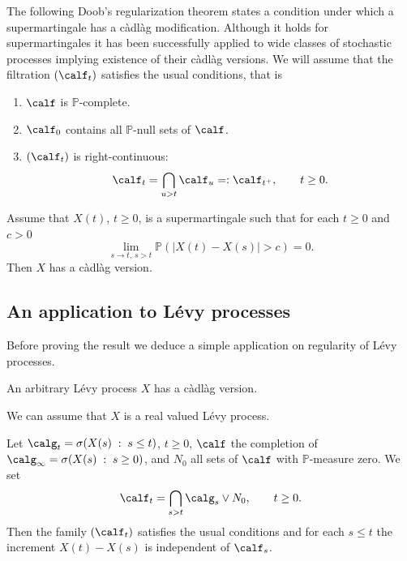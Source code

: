 \documentclass[preprint]{imsart}
\def\P{\mathbb P}
\begin{document}
{The following Doob's regularization theorem states a condition
under which a supermartingale has a c\`adl\`ag modification.
Although it holds for supermartingales it has been successfully
applied to wide classes of stochastic processes implying existence
of their c\`adl\`ag versions.
We will assume that the filtration $(\calf_t)$ satisfies the
usual conditions, that is
\begin{enumerate}
\item[1)] $\calf$ is $\P$-complete.
\item[2)] $\calf_0 $ contains all $\P$-null sets of $\calf$.
\item[3)] $(\calf_t)$ is right-continuous:
$$
\calf_t= \bigcap_{u>t}\calf_u=: \calf_{t^+},
\qquad t\ge 0.
$$
\end{enumerate}

\begin{Theorem}\label{doobreg}
  Assume that $X(t)$, $t\ge0$, is a supermartingale such that for
  each $t\ge 0$ and $c>0$
\begin{equation}\label{stocconti}
  \lim_{s\to t,\, s>t}\P (|X(t)-X(s)|>c)=0.
\end{equation}
Then $X$ has a c\`adl\`ag version.
\end{Theorem}

\subsection{An application to L\'evy processes}

Before proving the result we deduce a simple application on
regularity of L\'evy processes.

\begin{Theorem}\label{reglevyproc}
An arbitrary  L\'evy process  $X$
 has a c\`adl\`ag version.
\end{Theorem}

We can assume that $X$ is a real valued  L\'evy process.

Let $\calg_t=\sigma (X(s)\; :\; s\le t)$, $t\ge 0$,
$\calf$ the completion of $\calg_\infty = \sigma (X(s)\; :\; s\ge
0)$, and $N_0$ all sets of $\calf$ with $\P$-measure zero.
We set
$$
\calf_t = \bigcap_{s>t}\calg_s\vee N_0, \qquad t\ge0.
$$
Then the family $(\calf_t)$ satisfies the usual conditions and for
each $s\le t$ the increment $X(t)-X(s)$ is independent of
$\calf_s$.

}
\end{document}

